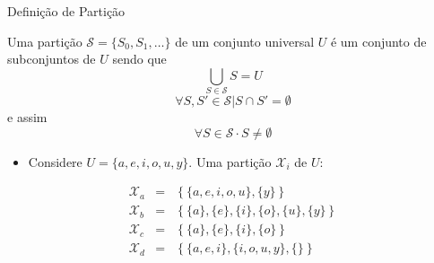    \begin{frame}{Definição de Partição}

      Uma partição $ \mathcal{S} = \{S_0, S_1, \dots\} $ de um conjunto universal $ U $ é um conjunto de subconjuntos de $ U $ sendo que
         \begin{equation}
            \bigcup_{S \in \mathcal{S}} S = U \label{eq:part_form_1}
         \end{equation}
         \begin{equation}
            \forall S, S' \in \mathcal{S} | S \cap S' = \emptyset \label{eq:part_form_2}
         \end{equation}
         e assim
         \begin{equation}
            \forall S \in \mathcal{S} \cdot S \neq \emptyset \label{eq:part_form_3}
         \end{equation}

            \bigskip

         \begin{itemize}
            \item Considere $ U = \{a, e, i, o, u, y\} $. Uma partição $ \mathcal{X}_i $ de $ U $:

         \end{itemize}
         \begin{eqnarray}
         \mathcal{X}_a &=& \left\{\{a, e, i, o, u\}, \{y\}\right\} \label{eq:xa} \\
         \mathcal{X}_b &=& \left\{\{a\}, \{e\}, \{i\}, \{o\}, \{u\}, \{y\}\right\} \label{eq:part_a} \\
         \mathcal{X}_c &=& \left\{\{a\}, \{e\}, \{i\}, \{o\} \right\} \label{eq:part_c} \\
         \mathcal{X}_d &=& \left\{\{a, e, i\}, \{i, o, u, y\}, \{\}\right\} \label{eq:part_d}
         \end{eqnarray}
   \end{frame}


